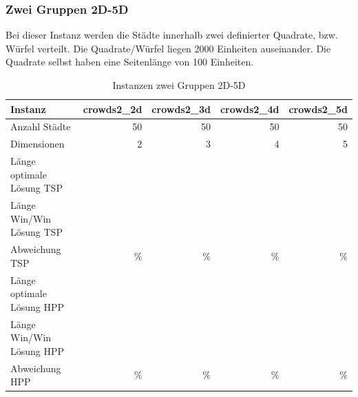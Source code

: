\documentclass[11pt,a4paper]{article}
\begin{document}
\subsubsection{Zwei Gruppen 2D-5D}
Bei dieser Instanz werden die Städte innerhalb zwei definierter Quadrate, bzw. Würfel verteilt. Die Quadrate/Würfel liegen 2000 Einheiten auseinander. Die Quadrate selbst haben eine Seitenlänge von 100 Einheiten.

\begin{table}[H]
        \centering
        \begin{tabular}{| l | r | r | r | r |}
            \hline
            Instanz                     & \textbf{crowds2\_2d}     
                                        & \textbf{crowds2\_3d}     
                                        & \textbf{crowds2\_4d}     
                                        & \textbf{crowds2\_5d}             \\ \hline
                Anzahl Städte               & 50        & 50       & 50         & 50        \\ \hline
                Dimensionen                 & 2         & 3        & 4          & 5         \\ \hline
                Länge optimale Lösung TSP   &           &          &            &           \\ \hline
                Länge Win/Win Lösung  TSP   &           &          &            &           \\ \hline
                Abweichung TSP              &     \%    &      \%  &      \%    &      \%   \\ \hline
                Länge optimale Lösung HPP   &           &          &            &           \\ \hline
                Länge Win/Win Lösung  HPP   &           &          &            &           \\ \hline
                Abweichung HPP              &     \%    &     \%   &     \%     &      \%   \\ \hline
        \end{tabular}
        \caption{Instanzen zwei Gruppen 2D-5D}
        \label{tab:instanzen_crowds2}
\end{table}
\end{document}
